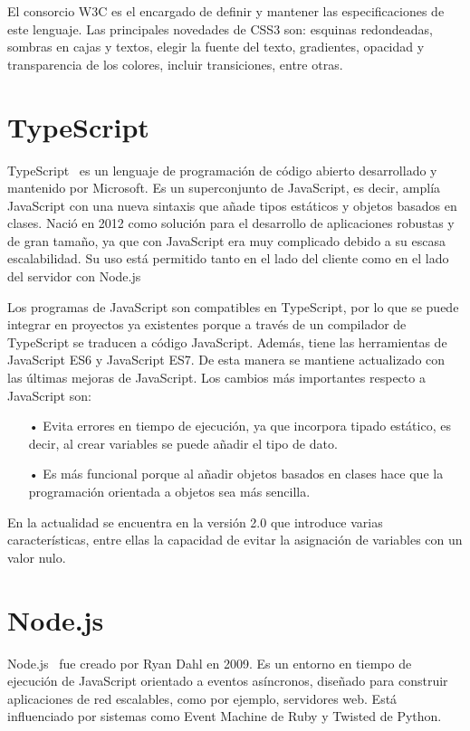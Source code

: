 \documentclass[a4paper, 12pt]{book}
\begin{document}
El consorcio W3C es el encargado de definir y mantener las especificaciones de este lenguaje. 
Las principales novedades de CSS3 son: esquinas redondeadas, sombras en cajas y textos, elegir la fuente del texto, gradientes, opacidad y transparencia de los colores, incluir transiciones, entre otras.

\section{TypeScript} 
\label{sec:TypeScript}

TypeScript~\cite{Pagina_de_typescript} es un lenguaje de programación de código abierto desarrollado y mantenido por Microsoft. 
Es un superconjunto de JavaScript, es decir, amplía JavaScript con una nueva sintaxis que añade tipos estáticos y objetos basados en clases. 
Nació en 2012 como solución para el desarrollo de aplicaciones  robustas y de gran tamaño, ya que con JavaScript era muy complicado debido a su escasa escalabilidad. 
Su uso está permitido tanto en el lado del cliente como en el lado del servidor con Node.js

 Los programas de JavaScript son compatibles en TypeScript, por lo que se puede integrar en proyectos ya existentes porque a través de un compilador de TypeScript se traducen a código JavaScript. 
Además, tiene las herramientas de JavaScript ES6 y JavaScript ES7. De esta manera se mantiene actualizado con las últimas mejoras de JavaScript. 
Los cambios más importantes respecto a JavaScript son:

\begin{itemize}
	\item[•] Evita errores en tiempo de ejecución, ya que incorpora tipado estático, es decir, al crear variables se puede añadir el tipo de dato.
	
	\item[•] Es más funcional porque al añadir objetos basados en clases hace que la programación orientada a objetos sea más sencilla.
\end{itemize}

En la actualidad se encuentra en la versión 2.0 que introduce varias características, entre ellas la capacidad de evitar la asignación de variables con un valor nulo. 

\section{Node.js} 
\label{sec:Node}

Node.js~\cite{Pagina_de_Node} fue creado por Ryan Dahl en 2009. Es un entorno en tiempo de ejecución de JavaScript orientado a eventos asíncronos, diseñado para construir aplicaciones de red escalables, como por ejemplo, servidores web. 
Está influenciado por sistemas como Event Machine de Ruby y Twisted de Python.
\end{document}
